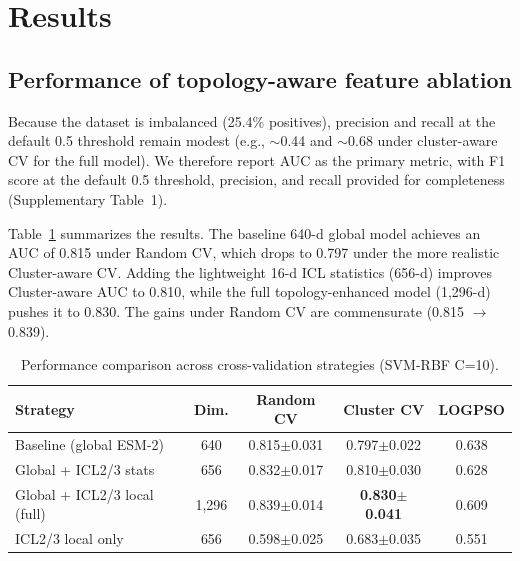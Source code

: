 \documentclass[11pt,a4paper]{article}
\begin{document}
\section{Results}

\subsection{Performance of topology-aware feature ablation}

Because the dataset is imbalanced (25.4\% positives), precision and recall at the default 0.5 threshold remain modest (e.g., $\sim$0.44 and $\sim$0.68 under cluster-aware CV for the full model). We therefore report AUC as the primary metric, with F1 score at the default 0.5 threshold, precision, and recall provided for completeness (Supplementary Table~1).

Table~\ref{tab:performance} summarizes the results. The baseline 640-d global model achieves an AUC of 0.815 under Random CV, which drops to 0.797 under the more realistic Cluster-aware CV. Adding the lightweight 16-d ICL statistics (656-d) improves Cluster-aware AUC to 0.810, while the full topology-enhanced model (1,296-d) pushes it to 0.830. The gains under Random CV are commensurate (0.815 $\rightarrow$ 0.839).

\begin{table}[H]
\centering
\caption{Performance comparison across cross-validation strategies (SVM-RBF C=10).}
\label{tab:performance}
\begin{tabular}{lcccc}
\toprule
\textbf{Strategy} & \textbf{Dim.} & \textbf{Random CV} & \textbf{Cluster CV} & \textbf{LOGPSO} \\
\midrule
Baseline (global ESM-2) & 640 & 0.815$\pm$0.031 & 0.797$\pm$0.022 & 0.638 \\
Global + ICL2/3 stats & 656 & 0.832$\pm$0.017 & 0.810$\pm$0.030 & 0.628 \\
Global + ICL2/3 local (full) & 1,296 & 0.839$\pm$0.014 & \textbf{0.830$\pm$0.041} & 0.609 \\
ICL2/3 local only & 656 & 0.598$\pm$0.025 & 0.683$\pm$0.035 & 0.551 \\
\bottomrule
\end{tabular}
\end{table}
\end{document}
